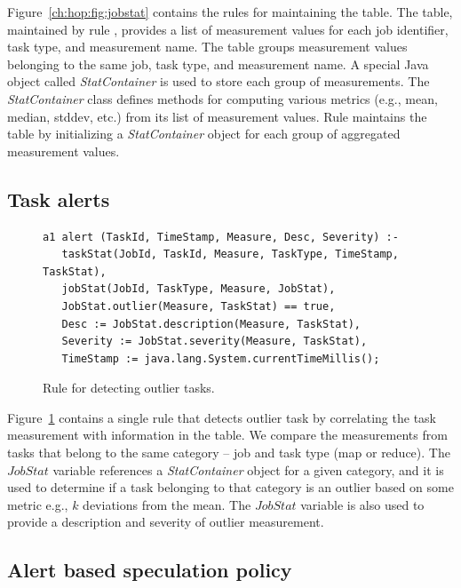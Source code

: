 Figure~\ref{ch:hop:fig:jobstat} contains the rules for maintaining the
 table.  The  table, maintained by rule ,
provides a list of measurement values for each job identifier, task type, and
measurement name.  The  table groups measurement values belonging
to the same job, task type, and measurement name.  A special Java object called
{\em StatContainer} is used to store each group of measurements.  The {\em
StatContainer} class defines methods for computing various metrics (e.g., mean,
median, stddev, etc.) from its list of measurement values.  Rule  maintains
the  table by initializing a {\em StatContainer} object for each group
of aggregated measurement values.


\subsection{Task alerts} 

\begin{figure}
\ssp
\centering
\begin{lstlisting}
a1 alert (TaskId, TimeStamp, Measure, Desc, Severity) :-
   taskStat(JobId, TaskId, Measure, TaskType, TimeStamp, TaskStat),
   jobStat(JobId, TaskType, Measure, JobStat),
   JobStat.outlier(Measure, TaskStat) == true,
   Desc := JobStat.description(Measure, TaskStat),
   Severity := JobStat.severity(Measure, TaskStat),
   TimeStamp := java.lang.System.currentTimeMillis();
\end{lstlisting}
\caption{\label{ch:hop:fig:outlier} Rule for detecting outlier tasks. }
\end{figure}

Figure~\ref{ch:hop:fig:outlier} contains a single rule that detects outlier
task by correlating the task measurement with information in the 
table.  We compare the measurements from tasks that belong to the same category
-- job and task type (map or reduce).  The $JobStat$ variable references a {\em
StatContainer} object for a given category, and it is used to determine if a
task belonging to that category is an outlier based on some metric e.g., $k$
deviations from the mean.  The $JobStat$ variable is also used to provide a
description and severity of outlier measurement.

\subsection{Alert based speculation policy} 
\label{ch:hop:sec:speculation}

